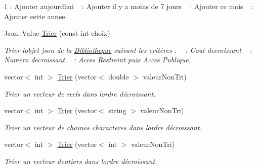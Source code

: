 \begin{DoxyCompactItemize}
\begin{DoxyCompactList}
 1 \+: Ajouter aujourd\textquotesingle{}hui ~ \+: Ajouter il y a moins de 7 jours ~ \+: Ajouter ce mois ~ \+: Ajouter cette annee. \end{DoxyCompactList}\item 
Json\+::\+Value \hyperlink{classBibliotheque_aa06803a5d680126cdbddbe4e1ab9395c}{Trier} (const int choix)
\begin{DoxyCompactList}\small\item\em Trier l\textquotesingle{}objet json de la \hyperlink{classBibliotheque}{Bibliotheque} suivant les critères \+: ~ \+: Cout decroissant ~ \+: Numero decroissant ~ \+: Acces Restreint puis Acces Publique. \end{DoxyCompactList}\item 
vector$<$ int $>$ \hyperlink{classBibliotheque_ad62c3fc7fd3829a0634a22ad98aa9332}{Trier} (vector$<$ double $>$ valeur\+Non\+Tri)
\begin{DoxyCompactList}\small\item\em Trier un vecteur de reels dans l\textquotesingle{}ordre décroissant. \end{DoxyCompactList}\item 
vector$<$ int $>$ \hyperlink{classBibliotheque_af95534b5f7fba8f1a6dcd1215bd55f96}{Trier} (vector$<$ string $>$ valeur\+Non\+Tri)
\begin{DoxyCompactList}\small\item\em Trier un vecteur de chaines characteres dans l\textquotesingle{}ordre décroissant. \end{DoxyCompactList}\item 
vector$<$ int $>$ \hyperlink{classBibliotheque_a0a0c1d628bfa840f764d4ec483f4b1e6}{Trier} (vector$<$ int $>$ valeur\+Non\+Tri)
\begin{DoxyCompactList}\small\item\em Trier un vecteur d\textquotesingle{}entiers dans l\textquotesingle{}ordre décroissant. \end{DoxyCompactList}\end{DoxyCompactItemize}
